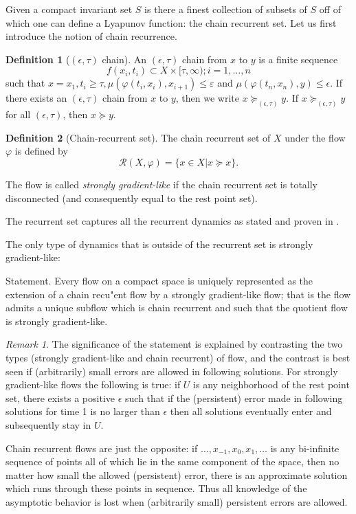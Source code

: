 \documentclass{scrartcl}
\theoremstyle{definition}
\newtheorem{definition}{Definition}
\theoremstyle{remark}
\newtheorem{remark}{Remark}
\begin{document}
Given a compact invariant set $S$ is there a finest collection of subsets of $S$ off of which one can define a Lyapunov function: the chain recurrent set. Let us first introduce the notion of chain recurrence.

\begin{definition}[$(\epsilon,\tau)$ chain]
An $(\epsilon,\tau)$ chain from $x$ to $y$ is a finite sequence 
\[f(x_i, t_i) \subset  X \times  [\tau,\infty); i = 1, \dots, n\]
such that $x = x_1, t_i\geq \tau, \mu(\varphi(t_i, x_i), x_{i+1})\leq \varepsilon$   and $\mu(\varphi(t_n, x_n), y)\leq \epsilon$.
 If there exists an $(\epsilon,\tau)$ chain from $x$ to $y$, then we write $x \succeq_{(\epsilon,\tau)}y$. If  $x \succeq_{(\epsilon,\tau)}y$ for all $(\epsilon,\tau)$, then  $x \succeq y$.
\end{definition}


\begin{definition}[Chain-recurrent set]
The chain recurrent set of $X$ under the flow $\varphi$ is defined by 
\[\mathcal{R}(X,\varphi) = \{x\in X|x\succeq x\}.\]
\end{definition}

The flow is called \emph{strongly gradient-like} if the chain recurrent set is totally disconnected (and consequently equal to the rest point set). 

The recurrent set captures all the recurrent dynamics as stated and proven in \citep[Chapter I.8.2]{conley1978}.

The only type of dynamics that is outside of the recurrent set is strongly gradient-like:

Statement. Every flow on a compact space is uniquely represented as the extension of a chain recu"ent flow by a strongly gradient-like flow; that is the flow admits a unique subflow which is chain recurrent and such that the quotient flow is strongly gradient-like.

\begin{remark}\label{rem:error_noise}
The significance of the statement is explained by contrasting the two types (strongly gradient-like and chain recurrent) of flow, and the contrast is best seen if (arbitrarily) small errors are allowed in following solutions. For strongly gradient-like flows the following is true: if $U$ is any neighborhood of the rest point set, there exists a positive $\epsilon$ such that if the (persistent) error made in following solutions for time 1 is no larger than $\epsilon$ then all solutions eventually enter and subsequently stay in $U$.

Chain recurrent flows are just the opposite: if $\dots,x_{-1},x_0, x_{1},\dots$ is any bi-infinite sequence of points all of which lie in the same component of the space, then no matter how small the allowed (persistent) error, there is an approximate solution which runs through these points in sequence. Thus all knowledge of the asymptotic behavior is lost when (arbitrarily small) persistent errors are allowed.
\end{remark}
\end{document}
